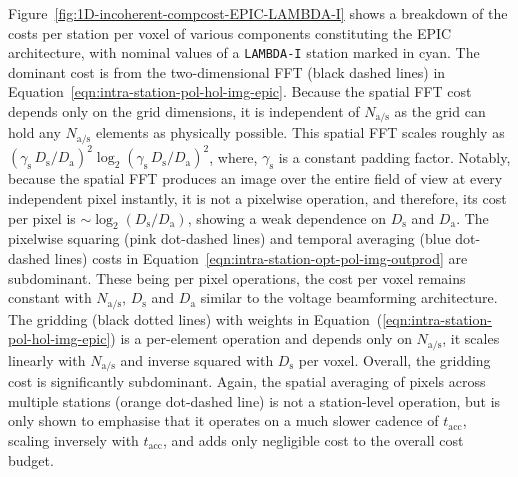 \documentclass[
  journal=pasa,
  manuscript=article-type,
  year=2020,
  volume=37,
]{cup-journal}
\begin{document}
Figure~\ref{fig:1D-incoherent-compcost-EPIC-LAMBDA-I} shows a breakdown of the costs per station per voxel of various components constituting the EPIC architecture, with nominal values of a \texttt{LAMBDA-I} station marked in cyan. The dominant cost is from the two-dimensional FFT (black dashed lines) in Equation~\ref{eqn:intra-station-pol-hol-img-epic}.
Because the spatial FFT cost depends only on the grid dimensions, it is independent of $N_\textrm{a/s}$ as the grid can hold any $N_\textrm{a/s}$ elements as physically possible. This spatial FFT scales roughly as $(\gamma_\textrm{s} \, D_\textrm{s}/D_\textrm{a})^2\log_2(\gamma_\textrm{s}\, D_\textrm{s}/D_\textrm{a})^2$, where, $\gamma_\textrm{s}$ is a constant padding factor. Notably, because the spatial FFT produces an image over the entire field of view at every independent pixel instantly, it is not a pixelwise operation, and therefore, its cost per pixel is $\sim \log_2(D_\textrm{s}/D_\textrm{a})$, showing a weak dependence on $D_\textrm{s}$ and $D_\textrm{a}$. The pixelwise squaring (pink dot-dashed lines) and temporal averaging (blue dot-dashed lines) costs in Equation~\ref{eqn:intra-station-opt-pol-img-outprod}
are subdominant. These being per pixel operations, the cost per voxel remains constant with $N_\textrm{a/s}$, $D_\textrm{s}$ and $D_\textrm{a}$ similar to the voltage beamforming architecture. The gridding (black dotted lines) with weights in Equation~(\ref{eqn:intra-station-pol-hol-img-epic})
is a per-element operation and depends only on $N_\textrm{a/s}$, it scales linearly with $N_\textrm{a/s}$ and inverse squared with $D_\textrm{s}$ per voxel. Overall, the gridding cost is significantly subdominant. Again, the spatial averaging of pixels across multiple stations (orange dot-dashed line) is not a station-level operation, but is only shown to emphasise that it operates on a much slower cadence of $t_\textrm{acc}$, scaling inversely with $t_\textrm{acc}$, and adds only negligible cost to the overall cost budget. 
\end{document}
